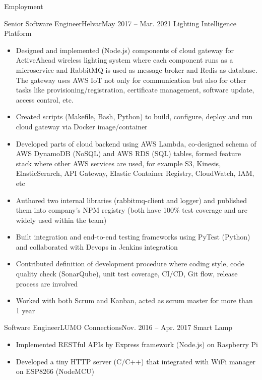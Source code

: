\documentclass[print]{mcdowellcv}
\begin{document}
\begin{cvsection}{Employment}
		\begin{cvsubsection}{Senior Software Engineer}{Helvar}{May 2017 -- Mar. 2021}
			Lighting Intelligence Platform
			\begin{itemize}
			    \item Designed and implemented (Node.js) components of cloud gateway for ActiveAhead wireless lighting system where each component runs as a microservice and RabbitMQ is used as message broker and Redis as database. The gateway uses AWS IoT not only for communication but also for other tasks like provisioning/registration, certificate management, software update, access control, etc.
				\item Created scripts (Makefile, Bash, Python) to build, configure, deploy and run cloud gateway via Docker image/container
				\item Developed parts of cloud backend using AWS Lambda, co-designed schema of AWS DynamoDB (NoSQL) and AWS RDS (SQL) tables, formed feature stack where other AWS services are used, for example S3, Kinesis, ElasticSerarch, API Gateway, Elastic Container Registry, CloudWatch, IAM, etc
				\item Authored two internal libraries (rabbitmq-client and logger) and published them into company's NPM registry (both have 100\% test coverage and are widely used within the team)
				\item Built integration and end-to-end testing frameworks using PyTest (Python) and collaborated with Devops in Jenkins integration
				\item Contributed definition of development procedure where coding style, code quality check (SonarQube), unit test coverage, CI/CD, Git flow, release process are involved
				\item Worked with both Scrum and Kanban, acted as scrum master for more than 1 year
			\end{itemize}
		\end{cvsubsection}
		
		\begin{cvsubsection}{Software Engineer}{LUMO Connections}{Nov. 2016 -- Apr. 2017}	
			Smart Lamp
			\begin{itemize}
				\item Implemented RESTful APIs by Express framework (Node.js) on Raspberry Pi
				\item Developed a tiny HTTP server (C/C++) that integrated with WiFi manager on ESP8266 (NodeMCU)
			\end{itemize}
		\end{cvsubsection}
			

\end{cvsection}
\end{document}
